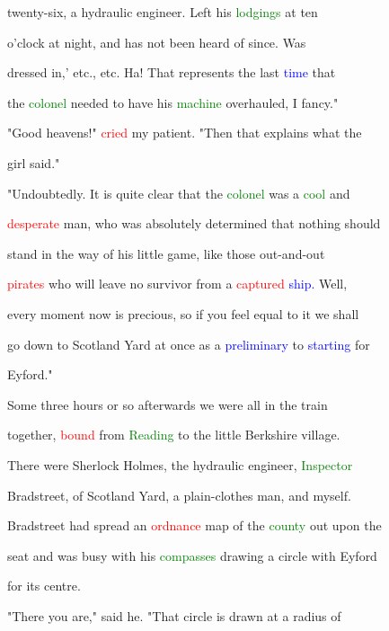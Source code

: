  twenty-six, a hydraulic engineer. Left his \textcolor{green}{lodgings} at ten

 o'clock at night, and has not been heard of since. Was

 dressed in,' etc., etc. Ha! That represents the last \textcolor{blue}{time} that

 the \textcolor{green}{colonel} needed to have his \textcolor{green}{machine} overhauled, I \textcolor{BurntOrange}{fancy."}



 \textcolor{BurntOrange}{"Good} heavens!" \textcolor{red}{cried} my \textcolor{BurntOrange}{patient.} "Then that explains what the

 girl said."



 "Undoubtedly. It is quite clear that the \textcolor{green}{colonel} was a \textcolor{green}{cool} and

 \textcolor{red}{desperate} man, who was absolutely determined that nothing should

 stand in the way of his little game, like those out-and-out

 \textcolor{red}{pirates} who will \textcolor{BurntOrange}{leave} no survivor from a \textcolor{red}{captured} \textcolor{blue}{ship.} Well,

 every moment now is \textcolor{BurntOrange}{precious,} so if you feel equal to it we shall

 go down to Scotland Yard at once as a \textcolor{blue}{preliminary} to \textcolor{blue}{starting} for

 Eyford."



 Some three hours or so afterwards we were all in the train

 together, \textcolor{red}{bound} from \textcolor{green}{Reading} to the little Berkshire village.

 There were Sherlock Holmes, the hydraulic engineer, \textcolor{green}{Inspector}

 Bradstreet, of Scotland Yard, a plain-clothes man, and myself.

 Bradstreet had spread an \textcolor{red}{ordnance} map of the \textcolor{green}{county} out upon the

 seat and was busy with his \textcolor{green}{compasses} drawing a circle with Eyford

 for its centre.



 "There you are," said he. "That circle is drawn at a radius of

